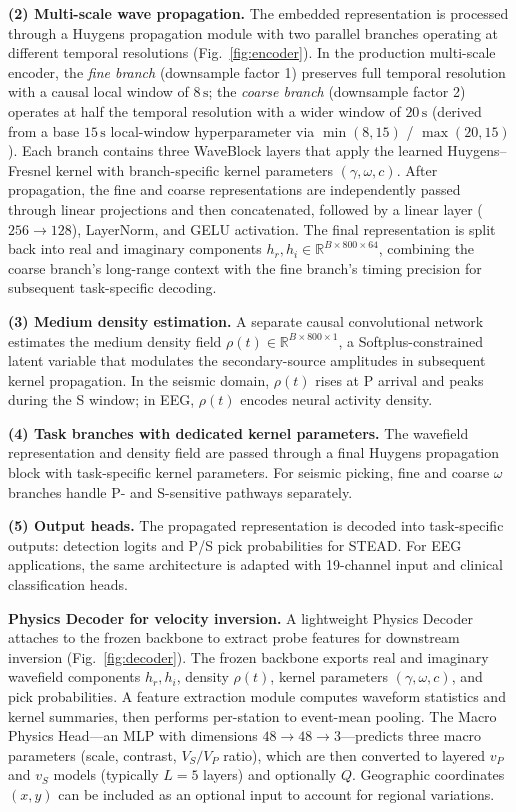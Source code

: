\documentclass[twocolumn, 10pt]{article}
\begin{document}
\textbf{(2) Multi-scale wave propagation.} The embedded representation is processed through a Huygens propagation module with two parallel branches operating at different temporal resolutions (Fig.~\ref{fig:encoder}). In the production multi-scale encoder, the \textit{fine branch} (downsample factor 1) preserves full temporal resolution with a causal local window of \(8\,\mathrm{s}\); the \textit{coarse branch} (downsample factor 2) operates at half the temporal resolution with a wider window of \(20\,\mathrm{s}\) (derived from a base \(15\,\mathrm{s}\) local-window hyperparameter via \(\min(8,15)\) / \(\max(20,15)\)). Each branch contains three WaveBlock layers that apply the learned Huygens--Fresnel kernel with branch-specific kernel parameters \((\gamma,\omega,c)\). After propagation, the fine and coarse representations are independently passed through linear projections and then concatenated, followed by a linear layer (\(256 \to 128\)), LayerNorm, and GELU activation. The final representation is split back into real and imaginary components \(h_r, h_i \in \mathbb{R}^{B \times 800 \times 64}\), combining the coarse branch's long-range context with the fine branch's timing precision for subsequent task-specific decoding.

\textbf{(3) Medium density estimation.} A separate causal convolutional network estimates the medium density field \(\rho(t) \in \mathbb{R}^{B \times 800 \times 1}\), a Softplus-constrained latent variable that modulates the secondary-source amplitudes in subsequent kernel propagation. In the seismic domain, \(\rho(t)\) rises at P arrival and peaks during the S window; in EEG, \(\rho(t)\) encodes neural activity density.

\textbf{(4) Task branches with dedicated kernel parameters.} The wavefield representation and density field are passed through a final Huygens propagation block with task-specific kernel parameters. For seismic picking, fine and coarse \(\omega\) branches handle P- and S-sensitive pathways separately.

\textbf{(5) Output heads.} The propagated representation is decoded into task-specific outputs: detection logits and P/S pick probabilities for STEAD. For EEG applications, the same architecture is adapted with 19-channel input and clinical classification heads.

\textbf{Physics Decoder for velocity inversion.} A lightweight Physics Decoder attaches to the frozen backbone to extract probe features for downstream inversion (Fig.~\ref{fig:decoder}). The frozen backbone exports real and imaginary wavefield components \(h_r, h_i\), density \(\rho(t)\), kernel parameters \((\gamma,\omega,c)\), and pick probabilities. A feature extraction module computes waveform statistics and kernel summaries, then performs per-station to event-mean pooling. The Macro Physics Head---an MLP with dimensions \(48 \to 48 \to 3\)---predicts three macro parameters (scale, contrast, \(V_S/V_P\) ratio), which are then converted to layered \(v_P\) and \(v_S\) models (typically \(L=5\) layers) and optionally \(Q\). Geographic coordinates \((x,y)\) can be included as an optional input to account for regional variations.
\end{document}
